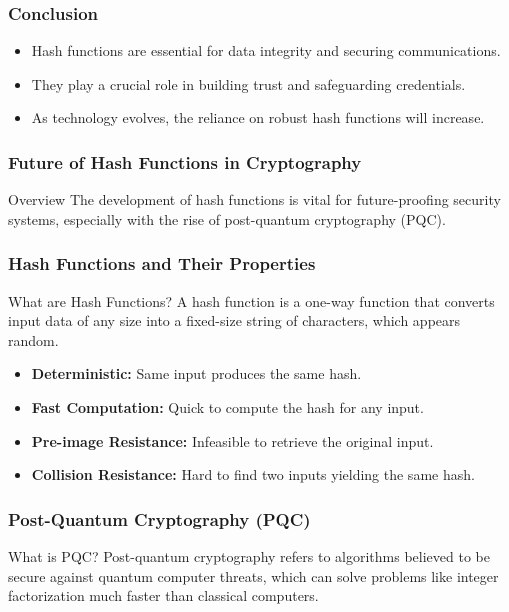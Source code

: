 \documentclass{beamer}
\begin{document}
\begin{frame}
    \frametitle{Conclusion}
    \begin{itemize}
        \item Hash functions are essential for data integrity and securing communications.
        \item They play a crucial role in building trust and safeguarding credentials.
        \item As technology evolves, the reliance on robust hash functions will increase.
    \end{itemize}
\end{frame}

\begin{frame}[fragile]
    \frametitle{Future of Hash Functions in Cryptography}
    \begin{block}{Overview}
        The development of hash functions is vital for future-proofing security systems, especially with the rise of post-quantum cryptography (PQC).
    \end{block}
\end{frame}

\begin{frame}[fragile]
    \frametitle{Hash Functions and Their Properties}
    \begin{block}{What are Hash Functions?}
        A hash function is a one-way function that converts input data of any size into a fixed-size string of characters, which appears random.
    \end{block}
    \begin{itemize}
        \item \textbf{Deterministic:} Same input produces the same hash.
        \item \textbf{Fast Computation:} Quick to compute the hash for any input.
        \item \textbf{Pre-image Resistance:} Infeasible to retrieve the original input.
        \item \textbf{Collision Resistance:} Hard to find two inputs yielding the same hash.
    \end{itemize}
\end{frame}

\begin{frame}[fragile]
    \frametitle{Post-Quantum Cryptography (PQC)}
    \begin{block}{What is PQC?}
        Post-quantum cryptography refers to algorithms believed to be secure against quantum computer threats, which can solve problems like integer factorization much faster than classical computers.
    \end{block}
\end{frame}
\end{document}

